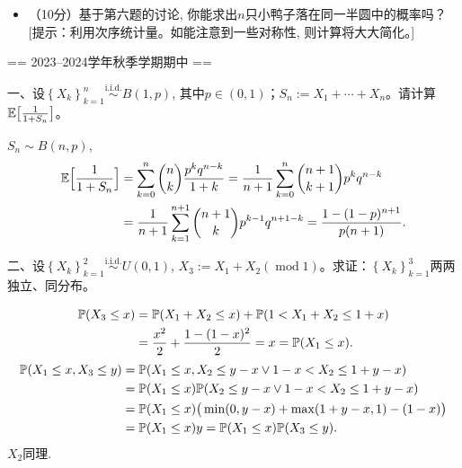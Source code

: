 \begin{itemize}
\item[附加题]（10分）基于第六题的讨论, 你能求出$n$只小鸭子落在同一半圆中的概率吗？
[提示：利用次序统计量。如能注意到一些对称性, 则计算将大大简化。]
\end{itemize}

== 2023--2024学年秋季学期期中 ==

一、设$\left\{X_k\right\}_{k=1}^{n}\mathop{\sim}\limits^{\text{i.i.d.}} B(1,p)$, 
其中$p\in(0,1)$；$S_n:=X_1+\cdots+X_n$。请计算$\mathbb{E}\big[\frac{1}{1+S_n}\big]$。

\begin{proofc}[解答]
    $S_n\sim B(n,p)$, 
    \begin{align*}\mathbb{E}\Big[\frac{1}{1+S_n}\Big]
    &=\sum_{k=0}^n\binom{n}{k}\frac{p^kq^{n-k}}{1+k}
    =\frac{1}{n+1}\sum_{k=0}^n\binom{n+1}{k+1}p^kq^{n-k}\\
    &=\frac{1}{n+1}\sum_{k=1}^{n+1}\binom{n+1}{k}p^{k-1}q^{n+1-k}
    =\frac{1-(1-p)^{n+1}}{p(n+1)}.\end{align*}
\end{proofc}

二、设$\left\{X_k\right\}_{k=1}^{2}\mathop{\sim}\limits^{\text{i.i.d.}} U(0,1)$, 
$X_3:=X_1+X_2(\operatorname{mod} 1)$。求证：$\left\{X_k\right\}_{k=1}^{3}$两两独立、同分布。
\begin{proofc}
    \begin{align*}\mathbb{P}(X_3\le x)&=\mathbb{P}(X_1+X_2\le x)+\mathbb{P}(1<X_1+X_2\le1+x)\\
    &=\frac{x^2}{2}+\frac{1-(1-x)^2}{2}=x
    =\mathbb{P}(X_1\le x).\end{align*}
    \begin{align*}\mathbb{P}(X_1\le x,X_3\le y)
    &=\mathbb{P}(X_1\le x,X_2\le y-x\vee 1-x<X_2\le 1+y-x)\\
    &=\mathbb{P}(X_1\le x)\mathbb{P}(X_2\le y-x\vee 1-x<X_2\le 1+y-x)\\
    &=\mathbb{P}(X_1\le x)\big(\min(0,y-x)+\max(1+y-x,1)-(1-x)\big)\\
    &=\mathbb{P}(X_1\le x)y=\mathbb{P}(X_1\le x)\mathbb{P}(X_3\le y).\end{align*}
    $X_2$同理.
\end{proofc}

